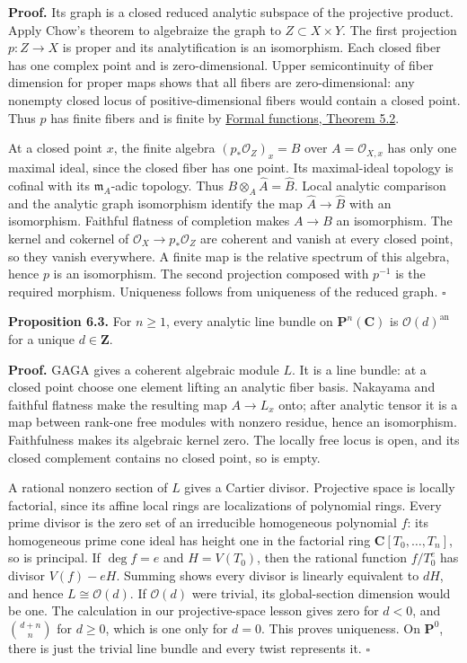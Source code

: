 \documentclass[11pt]{article}
\begin{document}
\textbf{Proof.} Its graph is a closed reduced analytic subspace of the
projective product. Apply Chow's theorem to algebraize the graph to
\(Z\subset X\times Y\). The first projection \(p:Z\to X\) is proper and
its analytification is an isomorphism. Each closed fiber has one complex
point and is zero-dimensional. Upper semicontinuity of fiber dimension
for proper maps shows that all fibers are zero-dimensional: any nonempty
closed locus of positive-dimensional fibers would contain a closed
point. Thus \(p\) has finite fibers and is finite by
\href{the-theorem-on-formal-functions.html\#5-dimension-and-finiteness-consequences}{Formal
functions, Theorem 5.2}.

At a closed point \(x\), the finite algebra \((p_*\mathcal O_Z)_x=B\)
over \(A=\mathcal O_{X,x}\) has only one maximal ideal, since the closed
fiber has one point. Its maximal-ideal topology is cofinal with its
\(\mathfrak m_A\)-adic topology. Thus
\(B\otimes_A\widehat A=\widehat B\). Local analytic comparison and the
analytic graph isomorphism identify the map \(\widehat A\to\widehat B\)
with an isomorphism. Faithful flatness of completion makes \(A\to B\) an
isomorphism. The kernel and cokernel of
\(\mathcal O_X\to p_*\mathcal O_Z\) are coherent and vanish at every
closed point, so they vanish everywhere. A finite map is the relative
spectrum of this algebra, hence \(p\) is an isomorphism. The second
projection composed with \(p^{-1}\) is the required morphism. Uniqueness
follows from uniqueness of the reduced graph. \(\square\)

\textbf{Proposition 6.3.} For \(n\geq1\), every analytic line bundle on
\(\mathbf P^n(\mathbf C)\) is \(\mathcal O(d)^{\mathrm{an}}\) for a
unique \(d\in\mathbf Z\).

\textbf{Proof.} GAGA gives a coherent algebraic module \(L\). It is a
line bundle: at a closed point choose one element lifting an analytic
fiber basis. Nakayama and faithful flatness make the resulting map
\(A\to L_x\) onto; after analytic tensor it is a map between rank-one
free modules with nonzero residue, hence an isomorphism. Faithfulness
makes its algebraic kernel zero. The locally free locus is open, and its
closed complement contains no closed point, so is empty.

A rational nonzero section of \(L\) gives a Cartier divisor. Projective
space is locally factorial, since its affine local rings are
localizations of polynomial rings. Every prime divisor is the zero set
of an irreducible homogeneous polynomial \(f\): its homogeneous prime
cone ideal has height one in the factorial ring
\(\mathbf C[T_0,\ldots,T_n]\), so is principal. If \(\deg f=e\) and
\(H=V(T_0)\), then the rational function \(f/T_0^e\) has divisor
\(V(f)-eH\). Summing shows every divisor is linearly equivalent to
\(dH\), and hence \(L\cong\mathcal O(d)\). If \(\mathcal O(d)\) were
trivial, its global-section dimension would be one. The calculation in
our projective-space lesson gives zero for \(d<0\), and
\(\binom{d+n}{n}\) for \(d\geq0\), which is one only for \(d=0\). This
proves uniqueness. On \(\mathbf P^0\), there is just the trivial line
bundle and every twist represents it. \(\square\)
\end{document}
